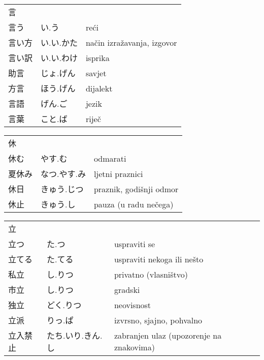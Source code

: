 

\newenvironment{dictentry}[1]{
	\begin{tabular}{p{2cm} p{3cm} p{10cm}}
		#1 &&\\
}{
	\end{tabular}
	\vspace{20pt}
}

\newcommand{\example}[3]{
	\hspace*{\fill}#1 & #2 & #3\\
}

\author{ロボット君}


\begin{dictentry}{言}
\example{言う}{い.う}{reći}
\example{言い方}{い.い.かた}{način izražavanja, izgovor}
\example{言い訳}{い.い.わけ}{isprika}
\example{助言}{じょ.げん}{savjet}
\example{方言}{ほう.げん}{dijalekt}
\example{言語}{げん.ご}{jezik}
\example{言葉}{こと.ば}{riječ}
\end{dictentry}

\begin{dictentry}{休}
\example{休む}{やす.む}{odmarati}
\example{夏休み}{なつ.やす.み}{ljetni praznici}
\example{休日}{きゅう.じつ}{praznik, godišnji odmor}
\example{休止}{きゅう.し}{pauza (u radu nečega)}
\end{dictentry}

\begin{dictentry}{立}
\example{立つ}{た.つ}{uspraviti se}
\example{立てる}{た.てる}{uspraviti nekoga ili nešto}
\example{私立}{し.りつ}{privatno (vlasništvo)}
\example{市立}{し.りつ}{gradski}
\example{独立}{どく.りつ}{neovisnost}
\example{立派}{りっ.ぱ}{izvrsno, sjajno, pohvalno}
\example{立入禁止}{たち.いり.きん.し}{zabranjen ulaz (upozorenje na znakovima)}
\end{dictentry}

